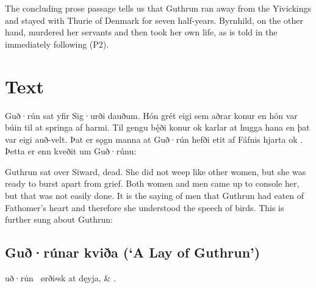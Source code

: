 The concluding prose passage tells us that Guthrun ran away from the Yivickings and stayed with Thurie of Denmark for seven half-years.  Byrnhild, on the other hand, murdered her servants and then took her own life, as is told in the immediately following  (P2).

\sectionline

\newpage

\section{Text}

\bpg\bpa%
%
Guð·rún sat yfir Sig·urði dauðum. Hón grét eigi sem aðrar konur en hón var búin til at springa af harmi.  Til gengu bę́ði konur ok karlar at hugga hana en þat var eigi auð-velt.  Þat er sǫgn manna at Guð·rún hefði etit af Fáfnis hjarta ok . Þetta er enn kveðit um Guð·rúnu:\epa

\bpb Guthrun sat over Siward, dead.  She did not weep like other women, but she was ready to burst apart from grief.  Both women and men came up to console her, but that was not easily done.  It is the saying of men that Guthrun had eaten of Fathomer’s heart and therefore she understood the speech of birds.  This is further sung about Guthrun:\epb\epg

\subsection{Guð·rúnar kviða (‘A Lay of Guthrun’)}

\bvg\bva%
 uð·ru̇n \hld\ ørði⸗sk at dęyja, &
.\eva

